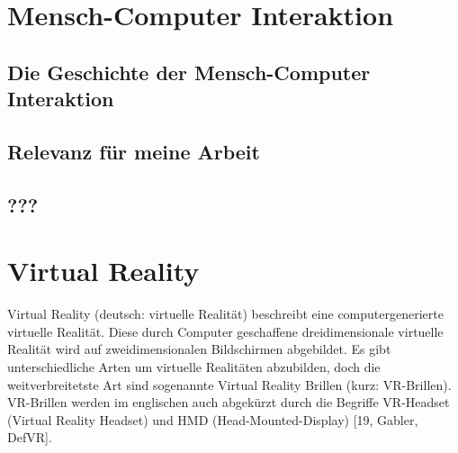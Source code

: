 \section{Mensch-Computer Interaktion}\label{sec:HCI}


\subsection{Die Geschichte der Mensch-Computer Interaktion}\label{sec:HCIGeschichte}


\subsection{Relevanz für meine Arbeit}\label{sec:RelevanzHCI}


\subsection{???}\label{sec:???}


\section{Virtual Reality}\label{sec:VR}
Virtual Reality (deutsch: virtuelle Realität) beschreibt eine computergenerierte virtuelle Realität. Diese durch Computer geschaffene dreidimensionale virtuelle Realität wird auf zweidimensionalen Bildschirmen abgebildet. Es gibt unterschiedliche Arten um virtuelle Realitäten abzubilden, doch die weitverbreitetste Art sind sogenannte Virtual Reality Brillen (kurz: VR-Brillen). VR-Brillen werden im englischen auch abgekürzt durch die Begriffe VR-Headset (Virtual Reality Headset) und HMD (Head-Mounted-Display) [19, Gabler, DefVR].

